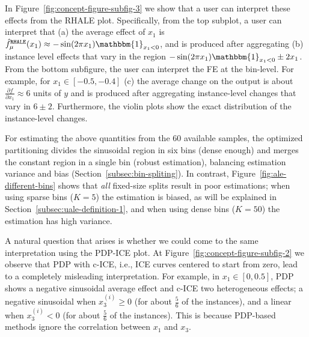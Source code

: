 \documentclass{ecai}  %
\begin{document}
In Figure~\ref{fig:concept-figure-subfig-3} we show that a user can
interpret these effects from the RHALE plot. Specifically, from the
top subplot, a user can interpret that (a) the average effect of
\(x_1\) is
\(\hat{f}_{\mu}^{\mathtt{RHALE}}(x_1) \approx -\sin(2 \pi x_1)
\mathbbm{1}_{x_1<0}\), and is produced after aggregating (b) instance
level effects that vary in the region
\(-\sin(2 \pi x_1) \mathbbm{1}_{x_1<0} \pm 2x_1\). From the bottom
subfigure, the user can interpret the FE at the bin-level. For
example, for \(x_1 \in [-0.5, -0.4]\) (c) the average change on the
output is about \(\frac{\partial f}{\partial x_1} \approx 6\) units of
\(y\) and is produced after aggregating instance-level changes that
vary in \(6 \pm 2\). Furthermore, the violin plots show the exact
distribution of the instance-level changes.

For estimating the above quantities from the 60 available
samples, the optimized partitioning divides the sinusoidal
region in six bins (dense enough) and merges the constant region in a
single bin (robust estimation), balancing estimation variance and bias
(Section~\ref{subsec:bin-spliting}).
In contrast, Figure~\ref{fig:ale-different-bins} shows that \textit{all}
fixed-size splits result in poor estimations;
when using sparse bins ($K=5$) the estimation is biased,
as will be explained in Section~\ref{subsec:uale-definition-1},
and when using dense bins ($K=50$) the estimation has high variance.


A natural question that arises is whether we could come to the same
interpretation using the PDP-ICE plot. At
Figure~\ref{fig:concept-figure-subfig-2} we observe that PDP with
c-ICE, i.e., ICE curves centered to start from zero, lead to a
completely misleading interpretation. For example, in
$x_1 \in [0, 0.5]$, PDP shows a negative sinusoidal average effect and
c-ICE two heterogeneous effects; a negative sinusoidal when
$x_3^{(i)} \geq 0$ (for about $\frac{5}{6}$ of the instances), and a
linear when $x_3^{(i)} < 0$ (for about $\frac{5}{6}$ of the
instances). This is because PDP-based methods ignore the correlation
between $x_1$ and $x_3$.
\end{document}
